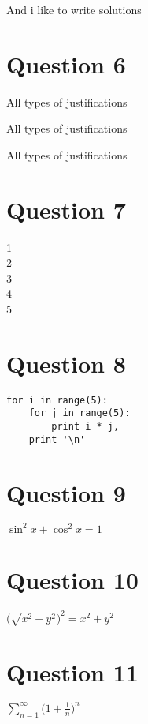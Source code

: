 \documentclass{article}
\begin{document}
And i like to write solutions

\section{Question 6}

\begin{flushleft}
All types of justifications
\end{flushleft}

\begin{center}
All types of justifications
\end{center}

\begin{flushright}
All types of justifications
\end{flushright}

\section{Question 7}

1 \\
2 \\
3 \\
4 \\
5

\section{Question 8}

\begin{verbatim}
for i in range(5):
    for j in range(5):
        print i * j,
    print '\n'
\end{verbatim}

\section{Question 9}

$\sin ^ 2 x + \cos ^ 2 x = 1$

\section{Question 10}

$\Big(\sqrt{x ^ 2 + y ^ 2}\Big) ^ 2 = x ^ 2 + y ^ 2$

\section{Question 11}

$\sum_{n = 1}^{\infty}\Big(1 + \frac{1}{n}\Big) ^ n$
\end{document}
